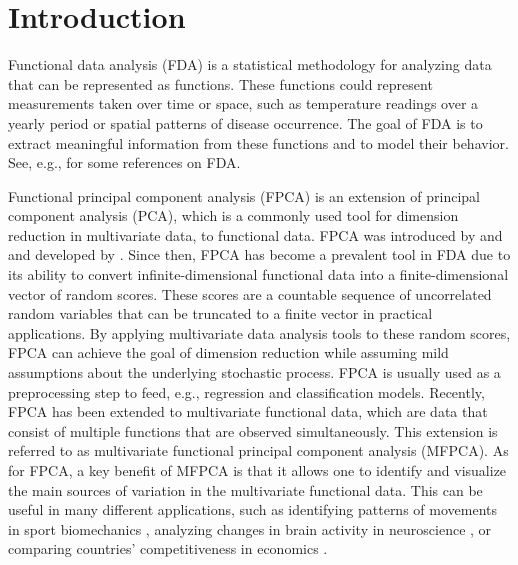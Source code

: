 \section{Introduction} %
\label{sec:introduction}

Functional data analysis (FDA) is a statistical methodology for analyzing data that can be represented as functions. These functions could represent measurements taken over time or space, such as temperature readings over a yearly period or spatial patterns of disease occurrence. The goal of FDA is to extract meaningful information from these functions and to model their behavior. See, e.g., \cite{ramsayFunctionalDataAnalysis2005,horvathInferenceFunctionalData2012,wangFunctionalDataAnalysis2016,kokoszkaSpecialIssueFunctional2017} for some references on FDA.

Functional principal component analysis (FPCA) is an extension of principal component analysis (PCA), which is a commonly used tool for dimension reduction in multivariate data, to functional data. FPCA was introduced by \cite{karhunenUeberLineareMethoden1947} and \cite{loeveFonctionsAleatoiresStationnaires1945} and developed by \cite{dauxoisAsymptoticTheoryPrincipal1982}. Since then, FPCA has become a prevalent tool in FDA due to its ability to convert infinite-dimensional functional data into a finite-dimensional vector of random scores. These scores are a countable sequence of uncorrelated random variables that can be truncated to a finite vector in practical applications. By applying multivariate data analysis tools to these random scores, FPCA can achieve the goal of dimension reduction while assuming mild assumptions about the underlying stochastic process. FPCA is usually used as a preprocessing step to feed, e.g., regression and classification models. Recently, FPCA has been extended to multivariate functional data, which are data that consist of multiple functions that are observed simultaneously. This extension is referred to as multivariate functional principal component analysis (MFPCA). As for FPCA, a key benefit of MFPCA is that it allows one to identify and visualize the main sources of variation in the multivariate functional data. This can be useful in many different applications, such as identifying patterns of movements in sport biomechanics \citep{warmenhovenBivariateFunctionalPrincipal2019}, analyzing changes in brain activity in neuroscience \citep{songSparseMultivariateFunctional2022}, or comparing  countries' competitiveness in economics \citep{krzyskoMultidimensionalEconomicIndicators2022}.

